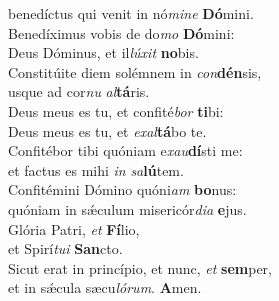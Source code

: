 \evenverse benedíctus qui venit in nó\textit{mi}\textit{ne} \textbf{Dó}mini.\\
\oddverse Benedíximus vobis de do\textit{mo} \textbf{Dó}mini:~\*\\
\oddverse Deus Dóminus, et il\textit{lú}\textit{xit} \textbf{no}bis.\\
\evenverse Constitúite diem solémnem in \textit{con}\textbf{dén}sis,~\*\\
\evenverse usque ad cor\textit{nu} \textit{al}\textbf{tá}ris.\\
\oddverse Deus meus es tu, et confité\textit{bor} \textbf{ti}bi:~\*\\
\oddverse Deus meus es tu, et \textit{e}\textit{xal}\textbf{tá}bo te.\\
\evenverse Confitébor tibi quóniam e\textit{xau}\textbf{dí}sti me:~\*\\
\evenverse et factus es mihi \textit{in} \textit{sa}\textbf{lú}tem.\\
\oddverse Confitémini Dómino quóni\textit{am} \textbf{bo}nus:~\*\\
\oddverse quóniam in sǽculum misericór\textit{di}\textit{a} \textbf{e}jus.\\
\evenverse Glória Patri, \textit{et} \textbf{Fí}lio,~\*\\
\evenverse et Spirí\textit{tu}\textit{i} \textbf{San}cto.\\
\oddverse Sicut erat in princípio, et nunc, \textit{et} \textbf{sem}per,~\*\\
\oddverse et in sǽcula sæcu\textit{ló}\textit{rum}. \textbf{A}men.\\

